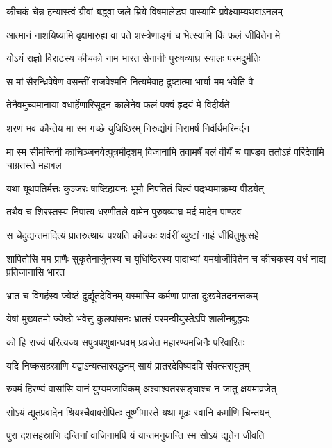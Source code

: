 \twolineshloka
{कीचकं चेन्न हन्यास्त्वं ग्रीवां बद्ध्वा जले म्रिये}
{विषमालेड्य पास्यामि प्रवेक्ष्याम्यथवाऽनलम्}


\twolineshloka
{आत्मानं नाशयिष्यामि वृक्षमारुह्य वा पते}
{शस्त्रेणाङ्गं च भेत्स्यामि किं फलं जीवितेन मे}


\twolineshloka
{योऽयं राज्ञो विराटस्य कीचको नाम भारत}
{सेनानीः पुरुषव्याघ्र स्यालः परमदुर्मतिः}


\twolineshloka
{स मां सैरन्ध्रिवेषेण वसन्तीं राजवेश्मनि}
{नित्यमेवाह दुष्टात्मा भार्या मम भवेति वै}


\twolineshloka
{तेनैवमुच्यमानाया वधार्हेणारिसूदन}
{कालेनेव फलं पक्वं हृदयं मे विदीर्यते}


\twolineshloka
{शरणं भव कौन्तेय मा स्म गच्छे युधिष्ठिरम्}
{निरुद्योगं निरामर्षं निर्वीर्यमरिमर्दन}


\onelineshloka
{मा स्म सीमन्तिनी काचिञ्जनयेत्पुत्रमीदृशम्}
\twolineshloka
{विजानामि तवामर्षं बलं वीर्यं च पाण्डव}
{ततोऽहं परिदेवामि चाग्रतस्ते महाबल}


\twolineshloka
{यथा यूथपतिर्मत्तः कुञ्जरः षाष्टिहायनः}
{भूमौ निपतितं बिल्वं पद्भ्यमाक्रम्य पीडयेत्}


\twolineshloka
{तथैव च शिरस्तस्य निपात्य धरणीतले}
{वामेन पुरुषव्याघ्र मर्द मादेन पाण्डव}


\twolineshloka
{स चेदुद्यन्तमादित्यं प्रातरुत्थाय पश्यति}
{कीचकः शर्वरीं व्युष्टां नाहं जीवितुमुत्सहे}


\threelineshloka
{शापितोसि मम प्राणैः सुकृतेनार्जुनस्य च}
{युधिष्ठिरस्य पादाभ्यां यमयोर्जीवितेन च}
{कीचकस्य वधं नाद्य प्रतिजानासि भारत}


\twolineshloka
{भ्रात च विगर्हस्व ज्येष्ठं दुर्द्यूतदेविनम्}
{यस्मास्मि कर्मणा प्राप्ता दुःखमेतदनन्तकम्}


\twolineshloka
{येषां मुख्यतमो ज्येष्ठो भवेत्तु कुलपांसनः}
{भ्रातरं परमन्वीयुस्तेऽपि शालीनबुद्धयः}


\twolineshloka
{को हि राज्यं परित्यज्य सपुत्रपशुबान्धवम्}
{प्रव्रजेत महारण्यमजिनैः परिवारितः}


\twolineshloka
{यदि निष्कसहस्राणि यद्वाऽन्यत्सारवद्धनम्}
{सायं प्रातरदेविष्यदपि संवत्सरायुतम्}


\twolineshloka
{रुक्मं हिरण्यं वासांसि यानं युग्यमजाविकम्}
{अश्वाश्वतरसङ्घाश्च न जातु क्षयमाव्रजेत्}


\twolineshloka
{सोऽयं द्यूतप्रवादेन श्रियश्चैवावरोपितः}
{तूष्णीमास्ते यथा मूढः स्वानि कर्माणि चिन्तयन्}


\twolineshloka
{पुरा दशसहस्राणि दन्तिनां वाजिनामपि}
{यं यान्तमनुयान्ति स्म सोऽयं द्यूतेन जीवति}


